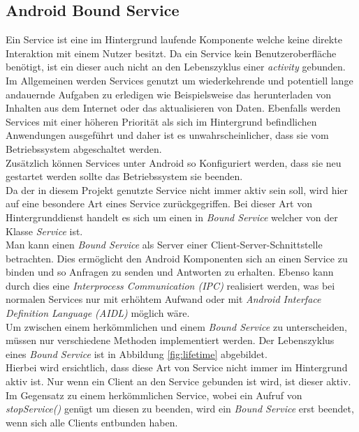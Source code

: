 \documentclass[]{report}
\begin{document}
\subsection{Android Bound Service}
Ein Service ist eine im Hintergrund laufende Komponente welche keine direkte Interaktion mit einem Nutzer besitzt. Da ein Service kein Benutzeroberfläche benötigt, ist ein dieser auch nicht an den Lebenszyklus einer \textit{activity} gebunden. Im Allgemeinen werden Services genutzt um wiederkehrende und potentiell lange andauernde Aufgaben zu erledigen wie Beispielsweise das herunterladen von Inhalten aus dem Internet oder das aktualisieren von Daten. Ebenfalls werden Services mit einer höheren Priorität als sich im Hintergrund befindlichen Anwendungen ausgeführt und daher ist es unwahrscheinlicher, dass sie vom Betriebssystem abgeschaltet werden. \\
Zusätzlich können Services unter Android so Konfiguriert werden, dass sie neu gestartet werden sollte das Betriebssystem sie beenden. \\
Da der in diesem Projekt genutzte Service nicht immer aktiv sein soll, wird hier auf eine besondere Art eines Service zurückgegriffen. Bei dieser Art von Hintergrunddienst handelt es sich um einen in \textit{Bound Service} welcher von der Klasse \textit{Service} ist. \\
Man kann einen \textit{Bound Service} als Server einer Client-Server-Schnittstelle betrachten. Dies ermöglicht den Android Komponenten sich an einen Service zu binden und so Anfragen zu senden und Antworten zu erhalten. Ebenso kann durch dies eine \textit{Interprocess Communication (IPC)} realisiert werden, was bei normalen Services nur mit erhöhtem Aufwand oder mit \textit{Android Interface Definition Language (AIDL)} möglich wäre. \\
Um zwischen einem herkömmlichen und einem \textit{Bound Service} zu unterscheiden, müssen nur verschiedene Methoden implementiert werden. Der Lebenszyklus eines \textit{Bound Service} ist in Abbildung \ref{fig:lifetime} abgebildet. \\
Hierbei wird ersichtlich, dass diese Art von Service nicht immer im Hintergrund aktiv ist. Nur wenn ein Client an den Service gebunden ist wird, ist dieser aktiv. Im Gegensatz zu einem herkömmlichen Service, wobei ein Aufruf von \textit{stopService()} genügt um diesen zu beenden, wird ein \textit{Bound Service} erst beendet, wenn sich alle Clients entbunden haben.
\end{document}
